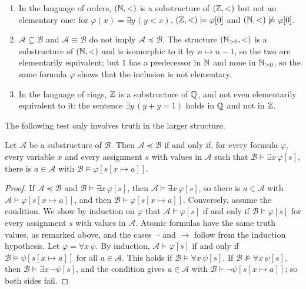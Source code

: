 \begin{example}\label{model-theory:example-substructures}
\begin{enumerate}
\item In the language of orders, $(\mathbb{N}, <)$ is a substructure of $(\mathbb{Z}, <)$ but not an elementary one: for $\varphi(x) = \exists y\,(y < x)$,
$(\mathbb{Z}, <) \models \varphi[0]$ and $(\mathbb{N}, <) \not\models \varphi[0]$.
\item $\mathcal{A} \subseteq \mathcal{B}$ and $\mathcal{A} \equiv \mathcal{B}$ do not imply $\mathcal{A} \preceq \mathcal{B}$. The structure $(\mathbb{N}_{>0}, <)$ is
a substructure of $(\mathbb{N}, <)$ and is isomorphic to it by $n \mapsto n - 1$, so the two are elementarily equivalent; but $1$ has a predecessor in $\mathbb{N}$ and none
in $\mathbb{N}_{>0}$, so the same formula $\varphi$ shows that the inclusion is not elementary.
\item In the language of rings, $\mathbb{Z}$ is a substructure of $\mathbb{Q}$, and not even elementarily equivalent to it: the sentence $\exists y\,(y + y = 1)$ holds in $\mathbb{Q}$
and not in $\mathbb{Z}$.
\end{enumerate}
\end{example}

The following test only involves truth in the larger structure.

\begin{lemma}\label{model-theory:lemma-tarski-vaught}
Let $\mathcal{A}$ be a substructure of $\mathcal{B}$. Then $\mathcal{A} \preceq \mathcal{B}$ if and only if, for every formula $\varphi$, every variable $x$
and every assignment $s$ with values in $\mathcal{A}$ such that $\mathcal{B} \models \exists x\,\varphi[s]$, there is $a \in \mathcal{A}$ with
$\mathcal{B} \models \varphi[s[x \mapsto a]]$.
\end{lemma}

\begin{proof}
If $\mathcal{A} \preceq \mathcal{B}$ and $\mathcal{B} \models \exists x\,\varphi[s]$, then $\mathcal{A} \models \exists x\,\varphi[s]$, so there is $a \in \mathcal{A}$
with $\mathcal{A} \models \varphi[s[x \mapsto a]]$, and then $\mathcal{B} \models \varphi[s[x \mapsto a]]$. Conversely, assume the condition. We show by
induction on $\varphi$ that $\mathcal{A} \models \varphi[s]$ if and only if $\mathcal{B} \models \varphi[s]$ for every assignment $s$ with values in $\mathcal{A}$.
Atomic formulas have the same truth values, as remarked above, and the cases $\neg$ and $\to$ follow from the induction hypothesis. Let
$\varphi = \forall x\,\psi$. By induction, $\mathcal{A} \models \varphi[s]$ if and only if $\mathcal{B} \models \psi[s[x \mapsto a]]$ for all $a \in \mathcal{A}$.
This holds if $\mathcal{B} \models \forall x\,\psi[s]$. If $\mathcal{B} \not\models \forall x\,\psi[s]$, then $\mathcal{B} \models \exists x\,\neg\psi[s]$, and the
condition gives $a \in \mathcal{A}$ with $\mathcal{B} \models \neg\psi[s[x \mapsto a]]$; so both sides fail.
\end{proof}

